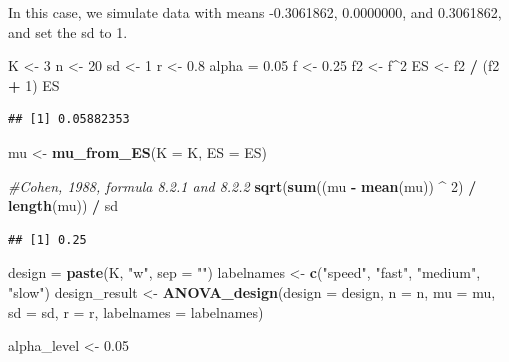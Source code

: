 \documentclass[]{book}
\newenvironment{Shaded}{\begin{snugshade}}{\end{snugshade}}
\newcommand{\CommentTok}[1]{\textcolor[rgb]{0.56,0.35,0.01}{\textit{#1}}}
\newcommand{\DataTypeTok}[1]{\textcolor[rgb]{0.13,0.29,0.53}{#1}}
\newcommand{\DecValTok}[1]{\textcolor[rgb]{0.00,0.00,0.81}{#1}}
\newcommand{\FloatTok}[1]{\textcolor[rgb]{0.00,0.00,0.81}{#1}}
\newcommand{\KeywordTok}[1]{\textcolor[rgb]{0.13,0.29,0.53}{\textbf{#1}}}
\newcommand{\NormalTok}[1]{#1}
\newcommand{\OperatorTok}[1]{\textcolor[rgb]{0.81,0.36,0.00}{\textbf{#1}}}
\newcommand{\StringTok}[1]{\textcolor[rgb]{0.31,0.60,0.02}{#1}}
\begin{document}
In this case, we simulate data with means -0.3061862, 0.0000000, and 0.3061862, and set the sd to 1.

\begin{Shaded}
\begin{Highlighting}[]
\NormalTok{K <-}\StringTok{ }\DecValTok{3}
\NormalTok{n <-}\StringTok{ }\DecValTok{20}
\NormalTok{sd <-}\StringTok{ }\DecValTok{1}
\NormalTok{r <-}\StringTok{ }\FloatTok{0.8}
\NormalTok{alpha =}\StringTok{ }\FloatTok{0.05}
\NormalTok{f <-}\StringTok{ }\FloatTok{0.25}
\NormalTok{f2 <-}\StringTok{ }\NormalTok{f}\OperatorTok{^}\DecValTok{2}
\NormalTok{ES <-}\StringTok{ }\NormalTok{f2 }\OperatorTok{/}\StringTok{ }\NormalTok{(f2 }\OperatorTok{+}\StringTok{ }\DecValTok{1}\NormalTok{)}
\NormalTok{ES}
\end{Highlighting}
\end{Shaded}

\begin{verbatim}
## [1] 0.05882353
\end{verbatim}

\begin{Shaded}
\begin{Highlighting}[]
\NormalTok{mu <-}\StringTok{ }\KeywordTok{mu_from_ES}\NormalTok{(}\DataTypeTok{K =}\NormalTok{ K, }\DataTypeTok{ES =}\NormalTok{ ES)}

\CommentTok{#Cohen, 1988, formula 8.2.1 and 8.2.2}
\KeywordTok{sqrt}\NormalTok{(}\KeywordTok{sum}\NormalTok{((mu }\OperatorTok{-}\StringTok{ }\KeywordTok{mean}\NormalTok{(mu)) }\OperatorTok{^}\StringTok{ }\DecValTok{2}\NormalTok{) }\OperatorTok{/}\StringTok{ }\KeywordTok{length}\NormalTok{(mu)) }\OperatorTok{/}\StringTok{ }\NormalTok{sd }
\end{Highlighting}
\end{Shaded}

\begin{verbatim}
## [1] 0.25
\end{verbatim}

\begin{Shaded}
\begin{Highlighting}[]
\NormalTok{design =}\StringTok{ }\KeywordTok{paste}\NormalTok{(K, }\StringTok{"w"}\NormalTok{, }\DataTypeTok{sep =} \StringTok{""}\NormalTok{)}
\NormalTok{labelnames <-}\StringTok{ }\KeywordTok{c}\NormalTok{(}\StringTok{"speed"}\NormalTok{, }\StringTok{"fast"}\NormalTok{, }\StringTok{"medium"}\NormalTok{, }\StringTok{"slow"}\NormalTok{)}
\NormalTok{design_result <-}\StringTok{ }\KeywordTok{ANOVA_design}\NormalTok{(}\DataTypeTok{design =}\NormalTok{ design,}
                   \DataTypeTok{n =}\NormalTok{ n, }
                   \DataTypeTok{mu =}\NormalTok{ mu, }
                   \DataTypeTok{sd =}\NormalTok{ sd, }
                   \DataTypeTok{r =}\NormalTok{ r, }
                   \DataTypeTok{labelnames =}\NormalTok{ labelnames)}

\NormalTok{alpha_level <-}\StringTok{ }\FloatTok{0.05}
\end{Highlighting}
\end{Shaded}
\end{document}
